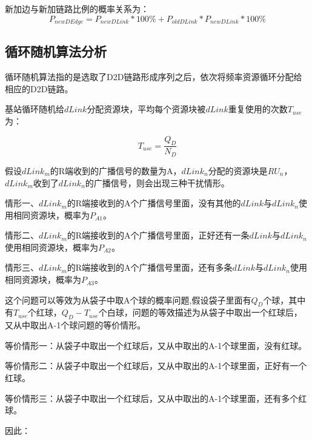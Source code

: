 \documentclass[figurelist,tablelist,algorithmlist,nomlist,masters]{seuthesix}
\begin{document}
	新加边与新加链路比例的概率关系为：
	\begin{equation}\label{eq3.1}
	{P_{newDEdge}} = {P_{newDLink}}*100\%  + {P_{oldDLink}}*{P_{newDLink}}*100\%
	\end{equation}
	
	\subsection{循环随机算法分析}
	
	循环随机算法指的是选取了D2D链路形成序列之后，依次将频率资源循环分配给相应的D2D链路。
	
	基站循环随机给$dLink$分配资源块，平均每个资源块被$dLink$重复使用的次数$T_{use}$为：
	
	\begin{equation}\label{eq3.1}
	T_{use} = \frac{{Q_D}}{{N_D}}
	\end{equation}
	
	假设$dLink_m$的R端收到的广播信号的数量为A，$dLink_n$分配的资源块是$RU_n$，$dLink_m$收到了$dLink_n$的广播信号，则会出现三种干扰情形。
	
	情形一、$dLink_m$的R端接收到的A个广播信号里面，没有其他的$dLink$与$dLink_n$使用相同资源块，概率为$P_{A1}$。
	
	情形二、$dLink_m$的R端接收到的A个广播信号里面，正好还有一条$dLink$与$dLink_n$使用相同资源块，概率为$P_{A2}$。
	
	情形三、$dLink_m$的R端接收到的A个广播信号里面，还有多条$dLink$与$dLink_n$使用相同资源块，概率为$P_{A3}$。
	
	这个问题可以等效为从袋子中取A个球的概率问题,假设袋子里面有$Q_D$个球，其中有$T_{use}$个红球，$Q_D - T_{use}$个白球，问题的等效描述为从袋子中取出一个红球后，又从中取出A-1个球问题的等价情形。
	
	等价情形一：从袋子中取出一个红球后，又从中取出的A-1个球里面，没有红球。
	
	等价情形二：从袋子中取出一个红球后，又从中取出的A-1个球里面，正好有一个红球。
	
	等价情形三：从袋子中取出一个红球后，又从中取出的A-1个球里面，还有多个红球。
	
	因此：
	
	
\end{document}
